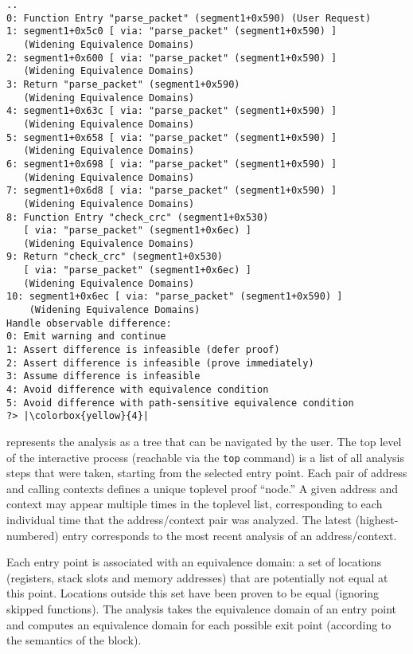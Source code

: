 \begin{lstlisting}
..
0: Function Entry "parse_packet" (segment1+0x590) (User Request)
1: segment1+0x5c0 [ via: "parse_packet" (segment1+0x590) ] 
   (Widening Equivalence Domains)
2: segment1+0x600 [ via: "parse_packet" (segment1+0x590) ] 
   (Widening Equivalence Domains)
3: Return "parse_packet" (segment1+0x590) 
   (Widening Equivalence Domains)
4: segment1+0x63c [ via: "parse_packet" (segment1+0x590) ] 
   (Widening Equivalence Domains)
5: segment1+0x658 [ via: "parse_packet" (segment1+0x590) ] 
   (Widening Equivalence Domains)
6: segment1+0x698 [ via: "parse_packet" (segment1+0x590) ] 
   (Widening Equivalence Domains)
7: segment1+0x6d8 [ via: "parse_packet" (segment1+0x590) ] 
   (Widening Equivalence Domains)
8: Function Entry "check_crc" (segment1+0x530) 
   [ via: "parse_packet" (segment1+0x6ec) ] 
   (Widening Equivalence Domains)
9: Return "check_crc" (segment1+0x530) 
   [ via: "parse_packet" (segment1+0x6ec) ] 
   (Widening Equivalence Domains)
10: segment1+0x6ec [ via: "parse_packet" (segment1+0x590) ] 
    (Widening Equivalence Domains)
Handle observable difference:
0: Emit warning and continue 
1: Assert difference is infeasible (defer proof) 
2: Assert difference is infeasible (prove immediately) 
3: Assume difference is infeasible 
4: Avoid difference with equivalence condition 
5: Avoid difference with path-sensitive equivalence condition
?> |\colorbox{yellow}{4}|
\end{lstlisting}

\pate{} represents the analysis as a tree that can be navigated by the user.
The top level of the interactive process (reachable via the \texttt{top} command) is a list of all analysis steps that were taken, starting from the selected entry point.
Each pair of address and calling contexts defines a unique toplevel proof ``node.''
A given address and context may appear multiple times in the toplevel list, corresponding to each individual time that the address/context pair was analyzed.
The latest (highest-numbered) entry corresponds to the most recent analysis of an address/context.

Each entry point is associated with an equivalence domain: a set of locations (registers, stack slots and memory addresses) that are potentially not equal at this point.
Locations outside this set have been proven to be equal (ignoring skipped functions).
The analysis takes the equivalence domain of an entry point and computes an equivalence domain for each possible exit point (according to the semantics of the block).

